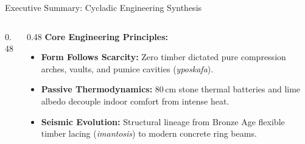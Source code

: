 \begin{frame}[label=summary]{Executive Summary: Cycladic Engineering Synthesis}
  \begin{columns}[T, onlytextwidth]
    \begin{column}{0.48\textwidth}
    \end{column}

    \begin{column}{0.48\textwidth}
      \textbf{\color{aegeanblue}Core Engineering Principles:}
      \vspace{0.2em}
      \begin{itemize}
        \setlength{\itemsep}{0.15em}
        \item \textbf{Form Follows Scarcity:} Zero timber dictated pure compression arches, vaults, and pumice cavities (\textit{yposkafa}).
        \item \textbf{Passive Thermodynamics:} 80\,cm stone thermal batteries and lime albedo decouple indoor comfort from intense heat.
        \item \textbf{Seismic Evolution:} Structural lineage from Bronze Age flexible timber lacing (\textit{imantosis}) to modern concrete ring beams.
      \end{itemize}

      \vspace{0.4em}
      \conclusionbox
    \end{column}
  \end{columns}
\end{frame}

